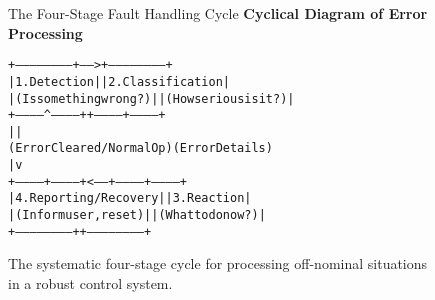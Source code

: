 \begin{figure}[h!]
    \centering
    \begin{infobox}{The Four-Stage Fault Handling Cycle}
        \textbf{Cyclical Diagram of Error Processing}

        {\footnotesize
        \begin{alltt}
+-----------------------+  ------>  +-----------------------+
| 1. Detection          |           | 2. Classification     |
| (Is something wrong?) |           | (How serious is it?)  |
+-----------^-----------+           +-----------+-----------+
            |                                   |
(Error Cleared/Normal Op)           (Error Details)
            |                                   v
+-----------+-----------+  <------  +-----------+-----------+
| 4. Reporting/Recovery |           | 3. Reaction           |
| (Inform user, reset)  |           | (What to do now?)     |
+-----------------------+           +-----------------------+
        \end{alltt}
        }
    \end{infobox}
    \vspace{0.3cm}
    \caption{The systematic four-stage cycle for processing off-nominal situations in a robust control system.}
    \label{fig:fault_handling_cycle}
\end{figure}

